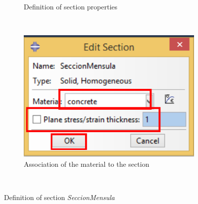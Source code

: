 \begin{enumerate}
\begin{figure}[H]
\begin{subfigure}{0.39\textwidth}
      \caption{Definition of section properties}
      \label{figu17}
    \end{subfigure}
    ~ %
    \begin{subfigure}{0.39\textwidth}
      \includegraphics[width=\textwidth]{./body/images/imagen18.pdf}
      \caption{Association of the material to the section}
      \label{figu18}
    \end{subfigure}
    ~ %
    \caption{Definition of section \textit{SeccionMensula}}
  \end{figure}



\end{enumerate}
